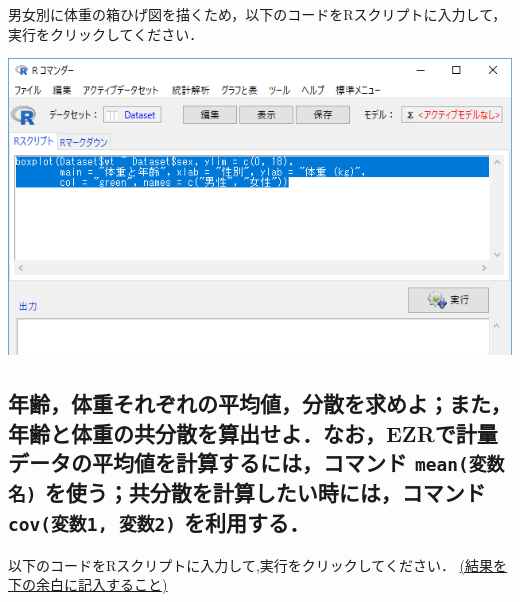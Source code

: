 \documentclass[]{problemset}
\newenvironment{Shaded}{\begin{snugshade}}{\end{snugshade}}
\newcommand{\DataTypeTok}[1]{\textcolor[rgb]{0.13,0.29,0.53}{#1}}
\newcommand{\DecValTok}[1]{\textcolor[rgb]{0.00,0.00,0.81}{#1}}
\newcommand{\KeywordTok}[1]{\textcolor[rgb]{0.13,0.29,0.53}{\textbf{#1}}}
\newcommand{\NormalTok}[1]{#1}
\newcommand{\OperatorTok}[1]{\textcolor[rgb]{0.81,0.36,0.00}{\textbf{#1}}}
\newcommand{\StringTok}[1]{\textcolor[rgb]{0.31,0.60,0.02}{#1}}
\begin{document}
男女別に体重の箱ひげ図を描くため，以下のコードをRスクリプトに入力して，実行をクリックしてください．

\begin{Shaded}
\end{Shaded}

\begin{center}\includegraphics[width=0.8\linewidth]{pic/box01} \end{center}

\hypertarget{ezr-mean--cov1-2-}{%
\subsection{\texorpdfstring{年齢，体重それぞれの平均値，分散を求めよ；また，年齢と体重の共分散を算出せよ．なお，EZRで計量データの平均値を計算するには，コマンド
\texttt{mean(変数名)} を使う；共分散を計算したい時には，コマンド
\texttt{cov(変数1,\ 変数2)}
を利用する．}{年齢，体重それぞれの平均値，分散を求めよ；また，年齢と体重の共分散を算出せよ．なお，EZRで計量データの平均値を計算するには，コマンド mean(変数名) を使う；共分散を計算したい時には，コマンド cov(変数1, 変数2) を利用する．}}\label{ezr-mean--cov1-2-}}

以下のコードをRスクリプトに入力して,実行をクリックしてください．\newline
\underline{(結果を下の余白に記入すること)}
\end{document}
